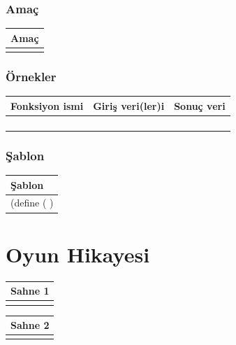 \documentclass[12pt, a4paper]{article}
\newcommand\fillin[1][3cm]{\makebox[#1]{\dotfill}}
\begin{document}
\subsubsection*{Amaç}
\begin{tabular}{| p{17cm} |  }
\hline			
Amaç\\
\hline
 \\[10ex]
\hline  
\end{tabular}

\subsubsection*{Örnekler}
\begin{tabular}{| p{4cm} | p{8cm} | p{4cm} |  }
\hline			
Fonksiyon ismi&Giriş veri(ler)i&Sonuç veri\\
\hline
& & \\[6ex]
\hline  
& & \\[6ex]
\hline  
& & \\[6ex]
\hline  
& & \\[6ex]
\hline  
\end{tabular}

\subsubsection*{Şablon}
\begin{tabular}{| p{17cm} |  }
\hline			
Şablon\\
\hline
\vspace{0,2cm}
(define (\fillin[2cm] \hspace{1cm}  \fillin[8cm] ) \\[30ex]
\hline  
\end{tabular}



\newpage
\section*{Oyun Hikayesi}
 
\noindent
\begin{tabular}{| p{16.5cm}  |  }
\hline			
Sahne 1\\
\hline
 \\[50ex]
\hline  
\end{tabular}

\vspace{5ex}
\noindent
\begin{tabular}{| p{16.5cm}  |  }
\hline			
Sahne 2\\
\hline
 \\[50ex]
\hline  
\end{tabular}
\end{document}
